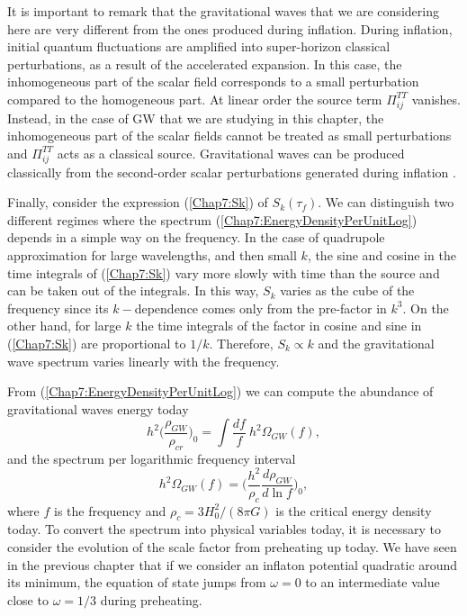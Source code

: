 \documentclass[11pt,a4paper,twoside]{book}
\begin{document}
It is important to remark that the gravitational waves that we are considering here are very different from the ones produced during inflation. During inflation, initial quantum fluctuations are amplified into super-horizon classical perturbations, as a result of the accelerated expansion. In this case, the inhomogeneous part of the scalar field corresponds to a small perturbation compared to the homogeneous part. At linear order the source term $ \Pi^{TT}_{ij} $ vanishes. Instead, in the case of GW that we are studying in this chapter, the inhomogeneous part of the scalar fields cannot be treated as small perturbations and $\Pi^{TT}_{ij}$ acts as a classical source. Gravitational waves can be produced classically from the second-order scalar perturbations generated during inflation \cite{GWFromInflation:Intro}.

Finally, consider the expression (\ref{Chap7:Sk}) of $ S_{k}(\tau_{f}) $. We can distinguish two different regimes where the spectrum (\ref{Chap7:EnergyDensityPerUnitLog}) depends in a simple way on the frequency. In the case of quadrupole approximation for large wavelengths, and then small $ k $, the sine and cosine in the time integrals of (\ref{Chap7:Sk}) vary more slowly with time than the source and can be taken out of the integrals. In this way, $ S_{k} $ varies as the cube of the frequency since its $ k-$dependence comes only from the pre-factor in $ k^{3} $. On the other hand, for large $ k $ the time integrals of the factor in cosine and sine in (\ref{Chap7:Sk}) are proportional to $ 1/k $. Therefore, $ S_{k} \propto k $ and the gravitational wave spectrum varies linearly with the frequency. 

From (\ref{Chap7:EnergyDensityPerUnitLog}) we can compute the abundance of gravitational waves energy  today
\begin{equation}
\label{Chap7:abundanceEnergyGw}
h^{2}\Bigg(\frac{\rho_{GW}}{\rho_{cr}}\Bigg)_{0}=\int \frac{df}{f}\  h^{2} \Omega_{GW}(f),
\end{equation}
and the spectrum per logarithmic frequency interval
\begin{equation}
\label{Chap7:SpectrumPerLogarithmicInterval}
h^{2}\Omega_{GW}(f) = \Bigg( \frac{h^{2}}{\rho_{c}}\frac{d\rho_{GW}}{d\ln f}   \Bigg)_{0},
\end{equation}
where $ f $ is the frequency and $\rho_{c}=3H_{0}^{2}/(8\pi G)$ is the critical energy density today. To convert the spectrum into physical variables today, it is necessary to consider the evolution of the scale factor from preheating up today. We have seen in the previous chapter that if we consider an inflaton potential quadratic around its minimum, the equation of state jumps from $\omega=0$ to an intermediate value close to $\omega=1/3$ during preheating.
\end{document}
